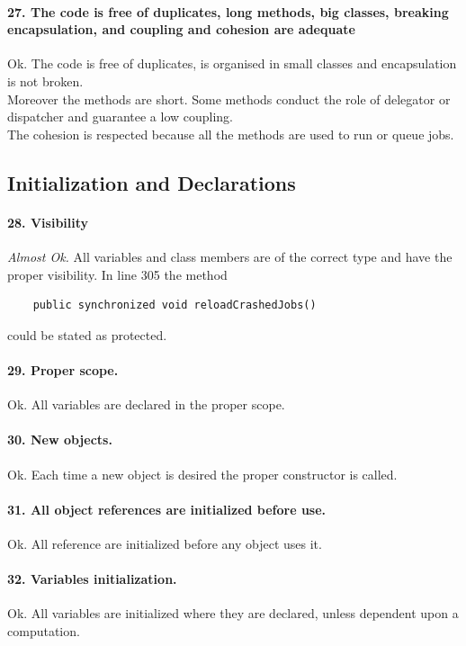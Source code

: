 \documentclass[english]{article}
\begin{document}
\paragraph{27. The code is free of duplicates, long methods, big classes, breaking encapsulation, and coupling and cohesion are adequate}
Ok.
The code is free of duplicates, is organised in small classes and encapsulation is not broken.\\
Moreover the methods are short. Some methods conduct the role of delegator or dispatcher and guarantee a low coupling.\\
The cohesion is respected because all the methods are used to run or queue jobs.

\subsection{Initialization and Declarations}

\paragraph{28. Visibility} \textit{Almost Ok.}
All variables and class members are of the correct type and have the proper visibility.
In line 305 the method 
\begin{lstlisting} 
	public synchronized void reloadCrashedJobs()
\end{lstlisting} 
could be stated as protected.

\paragraph{29. Proper scope.} 
Ok. All variables are declared in the proper scope.

\paragraph{30. New objects.} 
Ok. Each time a new object is desired the proper constructor is called.

\paragraph{31. All object references are initialized before use.} 
Ok. All reference are initialized before any object uses it. 

\paragraph{32. Variables initialization.} 
Ok. All variables are initialized where they are declared, unless dependent upon a computation.
\end{document}
